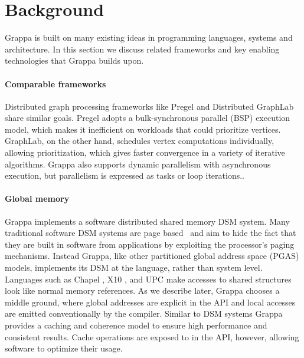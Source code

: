 \section{Background}

Grappa is built on many existing ideas in programming languages, systems and
architecture. In this section we discuss related frameworks and key enabling
technologies that Grappa builds upon.

\paragraph{Comparable frameworks}
Distributed graph processing frameworks like Pregel \cite{pregel:2010} and
Distributed GraphLab \cite{distgraphlab:vldb12} share similar goals. Pregel
adopts a bulk-synchronous parallel (BSP) execution model, which makes it
inefficient on workloads that could prioritize vertices. GraphLab, on the
other hand, schedules vertex computations individually, allowing
prioritization, which gives faster convergence in a variety of iterative
algorithms. Grappa also supports dynamic parallelism
with asynchronous execution, but parallelism is expressed as tasks or loop
iterations..

\paragraph{Global memory}
Grappa implements a software distributed shared memory DSM system. Many
traditional software DSM systems are page based~\cite{Treadmarks,munin} and
aim to hide the fact that they are built in software from applications by
exploiting the processor's paging mechanisms. Instead Grappa, like other
partitioned global address space (PGAS) models, implements its DSM at the
language, rather than system level. Languages such as Chapel \cite{Chapel},
X10 \cite{X10}, and UPC \cite{UPC} make accesses to shared structures look
like normal memory references. As we describe later, Grappa chooses a middle
ground, where global addresses are explicit in the API and local accesses are
emitted conventionally by the compiler. Similar to DSM systems Grappa provides
a caching and coherence model to ensure high performance and consistent
results. Cache operations are exposed to in the API, however, allowing
software to optimize their usage.


